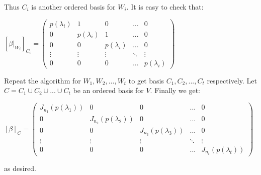 \documentclass{article}
\begin{document}
Thus $C_i$ is another ordered basis for $W_i.$ It is easy to check that:\begin{center}
$[\beta|_{W_i}]_{C_i} = \begin{pmatrix}
    p(\lambda_i) & 1 & 0 & ... & 0 \\
    0 & p(\lambda_i) & 1 & ... & 0 \\ 0 & 0 & p(\lambda_i) & ... & 0 \\ \vdots & \vdots & \vdots & \ddots & \vdots \\ 0 & 0 & 0 & ... & p(\lambda_i)
\end{pmatrix}$  
\end{center}
Repeat the algorithm for $W_1, W_2,...,W_t$ to get basis $C_1,C_2,...,C_t$ respectively. Let $C = C_1 \cup C_2 \cup ... \cup C_t$ be an ordered basis for $V$. Finally we get:
\begin{center}
$[\beta]_{C}= \begin{pmatrix}
    J_{n_1}(p(\lambda_1)) & 0 & 0 & ... & 0 \\
    0 & J_{n_2}(p(\lambda_2)) & 0 & ... & 0 \\ 0 & 0 & J_{n_3}(p(\lambda_3)) & ... & 0 \\ \vdots & \vdots & \vdots & \ddots & \vdots \\ 0 & 0 & 0 & ... & J_{n_t}(p(\lambda_t))
\end{pmatrix}$
\end{center}
as desired.
\end{document}
